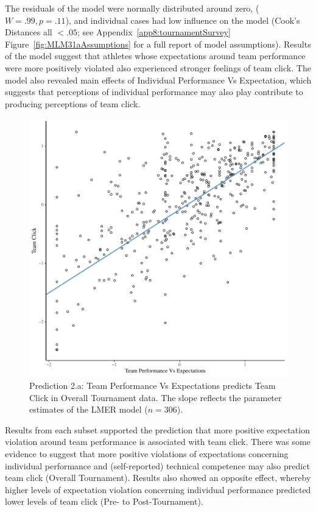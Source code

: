 \begin{CJK}{UTF8}{gbsn}
The residuals of the model were normally distributed around zero, ($W = .99, p = .11$), and individual cases had low influence on the model (Cook's Distances all $< .05$; see Appendix~\ref{app8:tournamentSurvey} Figure~\ref{fig:MLM31aAssumptions} for a full report of model assumptions).  Results of the model suggest that athletes whose expectations around team performance were more positively violated also experienced stronger feelings of team click.  The model also revealed main effects of Individual Performance Vs Expectation, which suggests that perceptions of individual performance may also play contribute to producing perceptions of team click.


   \begin{figure}[htbp]
     \centering
   \includegraphics[scale=.5]{images/teamPerfClickOverallModelSlope.pdf}
     \caption{Prediction 2.a: Team Performance Vs Expectations predicts Team Click in Overall Tournament data.  The slope reflects the parameter estimates of the LMER model ($n = 306$).}
     \label{fig:teamPerfClickOverallModelSlope}
   \end{figure}


Results from each subset supported the prediction that more positive expectation violation around team performance is associated with team click.  There was some evidence to suggest that more positive violations of expectations concerning individual performance and (self-reported) technical competence may also predict team click (Overall Tournament).  Results also showed an opposite effect, whereby higher levels of expectation violation concerning individual performance predicted lower levels of team click (Pre- to Post-Tournament).





\end{CJK}
